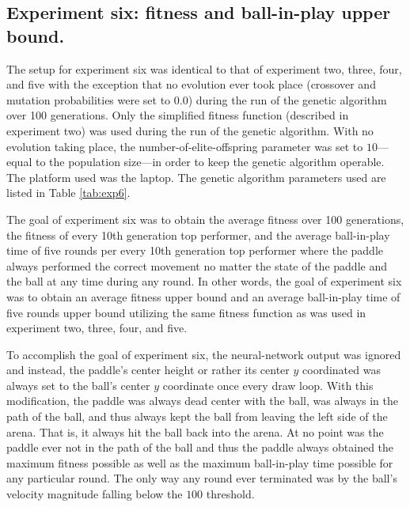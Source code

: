 \documentclass[a4paper,10pt]{article}
\begin{document}
\subsection{Experiment six: fitness and ball-in-play upper bound.}

The setup for experiment six was identical to that of experiment two, three, four, and five with the exception that no evolution ever took place (crossover and mutation probabilities were set to $0.0$) during the run of the genetic algorithm over 100 generations. Only the simplified fitness function (described in experiment two) was used during the run of the genetic algorithm. With no evolution taking place, the number-of-elite-offspring parameter was set to $10$---equal to the population size---in order to keep the genetic algorithm operable. The platform used was the laptop. The genetic algorithm parameters used are listed in Table \ref{tab:exp6}. 

The goal of experiment six was to obtain the average fitness over 100 generations, the fitness of every 10th generation top performer, and the average ball-in-play time of five rounds per every 10th generation top performer where the paddle always performed the correct movement no matter the state of the paddle and the ball at any time during any round. In other words, the goal of experiment six was to obtain an average fitness upper bound and an average ball-in-play time of five rounds upper bound utilizing the same fitness function as was used in experiment two, three, four, and five. 

To accomplish the goal of experiment six, the neural-network output was ignored and instead, the paddle's center height or rather its center $y$ coordinated was always set to the ball's center $y$ coordinate once every draw loop. With this modification, the paddle was always dead center with the ball, was always in the path of the ball, and thus always kept the ball from leaving the left side of the arena. That is, it always hit the ball back into the arena. At no point was the paddle ever not in the path of the ball and thus the paddle always obtained the maximum fitness possible as well as the maximum ball-in-play time possible for any particular round. The only way any round ever terminated was by the ball's velocity magnitude falling below the $100$ threshold.  
\end{document}

